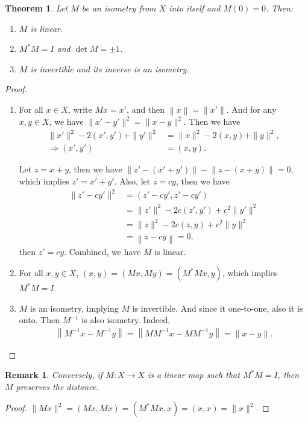 \documentclass[10pt]{book}
\newtheorem{theorem}{Theorem}[chapter]
\newtheorem{remark}{Remark}[chapter]
\theoremstyle{definition}
\numberwithin{equation}{chapter}
\begin{document}
\begin{theorem}\label{isometry_properties}
Let $M$ be an isometry from $X$ into itself and $M(0) = 0$. Then:
\begin{enumerate}[label=(\alph*)]
    \item $M$ is linear.
    \item $M^* M = I$ and $\det M = \pm 1$.
    \item $M$ is invertible and its inverse is an isometry.
\end{enumerate}
\end{theorem}
\begin{proof}
~\begin{enumerate}[label=(\alph*)]
    \item For all $x\in X$, write $Mx = x'$, and then $\left\|x\right\|= \|x'\|$. And for any $x,y\in X$, we have $\|x' - y'\|^2 = \|x - y\|^2$. Then we have
    \begin{align*}
        \|x'\|^2 - 2(x', y') + \|y'\|^2 & = \|x\|^2 - 2(x, y) + \|y\|^2, \\
        \Rightarrow (x', y') & = (x, y).
    \end{align*}
    
    Let $z = x + y$, then we have $\left\|z'-(x'+y')\right\| - \left\|z-(x+y)\right\| = 0$, which implies $z' = x' + y'$. Also, let $z = cy$, then we have
    \begin{align*}
        \|z' - cy'\|^2 & = (z' - cy', z' - cy') \\
        & = \|z'\|^2 - 2c (z', y') + c^2 \|y'\|^2 \\
        & = \|z\|^2 - 2c (z, y) + c^2 \|y\|^2 \\
        & = \left\|z - cy\right\|= 0,
    \end{align*}
    then $z' = cy$. Combined, we have $M$ is linear.
    \item For all $x,y\in X$, $(x,y) = (Mx, My) = (M^* M x, y)$, which implies $M^* M = I$.
    \item $M$ is an isometry, implying $M$ is invertible. And since it one-to-one, also it is onto. Then $M^{-1}$ is also isometry. Indeed, 
    \begin{align*}
        \left\|M^{-1}x - M^{-1}y\right\| = \left\|M M^{-1}x - M M^{-1}y\right\| = \|x - y\|.
    \end{align*}
\end{enumerate}
\end{proof}

\begin{remark}
Conversely, if $M:X\to X$ is a linear map such that $M^* M = I$, then $M$ preserves the distance.
\end{remark}
\begin{proof}
$\|Mx\|^2 = (Mx, Mx) = (M^* M x, x) = (x, x) = \|x\|^2$.
\end{proof}
\end{document}
